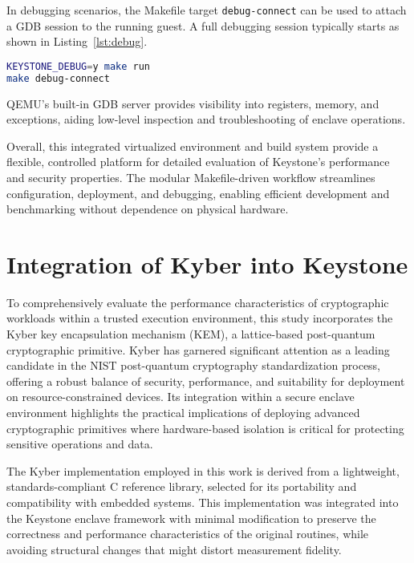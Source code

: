 In debugging scenarios, the Makefile target \texttt{debug-connect} can be used to attach a GDB session to the running guest. A full debugging session typically starts as shown in Listing~\ref{lst:debug}.

\begin{lstlisting}[language=bash, label={lst:debug}, caption={Starting a QEMU session with GDB debugging enabled}]
KEYSTONE_DEBUG=y make run
make debug-connect
\end{lstlisting}

QEMU’s built-in GDB server provides visibility into registers, memory, and exceptions, aiding low-level inspection and troubleshooting of enclave operations.

Overall, this integrated virtualized environment and build system provide a flexible, controlled platform for detailed evaluation of Keystone’s performance and security properties. The modular Makefile-driven workflow streamlines configuration, deployment, and debugging, enabling efficient development and benchmarking without dependence on physical hardware. %

\section{Integration of Kyber into Keystone}
\label{sec:kyber-enclave}

To comprehensively evaluate the performance characteristics of cryptographic workloads within a trusted execution environment, this study incorporates the Kyber key encapsulation mechanism (KEM), a lattice-based post-quantum cryptographic primitive. Kyber has garnered significant attention as a leading candidate in the NIST post-quantum cryptography standardization process, offering a robust balance of security, performance, and suitability for deployment on resource-constrained devices. Its integration within a secure enclave environment highlights the practical implications of deploying advanced cryptographic primitives where hardware-based isolation is critical for protecting sensitive operations and data.

The Kyber implementation employed in this work is derived from a lightweight, standards-compliant C reference library, selected for its portability and compatibility with embedded systems. This implementation was integrated into the Keystone enclave framework with minimal modification to preserve the correctness and performance characteristics of the original routines, while avoiding structural changes that might distort measurement fidelity. 

